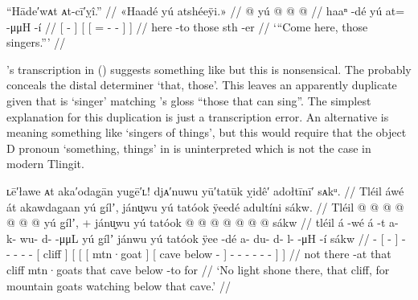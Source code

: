\ex\label{ex:91-78-cmere-singers}%
%
\begingl
	\glpreamble	“Hāde′wᴀt ᴀt-cī′ỵî.” //
	\glpreamble	«\!Haadé yú atshéeÿi.\!» //
	\gla	{}  @ {} {}
		{} yú {}  @ {} @ {} @ {} {} {} //
	\glb	{} haaⁿ -dé {}
		{} yú {} at=  -μμH -í {} {} //
	\glc	{}[  - {}]
		{}[  {}[ =  - - {}] {}] //
	\gld	{} here -to {}
		{} those {} sth\•  {} -er {} {} //
	\glft	‘“Come here, those singers.”’
		//
\endgl
\xe

\citeauthor{swanton:1909}’s transcription  in (\lastx) suggests something like  but this is nonsensical.
The  probably conceals the distal determiner  ‘that, those’.
This leaves an apparently duplicate  given that  is  ‘singer’ matching \citeauthor{swanton:1909}’s gloss “those that can sing”.
The simplest explanation for this duplication is just a transcription error.
An alternative is  meaning something like ‘singers of things’, but this would require that the object D pronoun  ‘something, things’ in  is uninterpreted which is not the case in modern Tlingit.

\ex\label{ex:91-79-no-light-mtn-goats-watching}%
%
\begingl
	\glpreamble	ʟē′ławe ᴀt aka′odag̣ān yug̣ē′ʟ! djᴀ′nuwu yū′tatūk ỵidê′ adołtīnī′ sᴀkᵘ. //
	\glpreamble	Tléil áwé át akawdagaan yú g̱ílʼ, jánu̬wu yú tatóok ÿeedé adultíni sákw. //
	\gla	Tléil  @ {} {}  @ {} {}
		 @ {} @ {} @ {} @ {} @ {}
		{} yú g̱ílʼ, {} +
		{} {} {} jánu̬wu {} {} yú tatóok  @ {} {}
			 @ {} @ {} @ {} @ {} @ {} @ {} {} sákw {} //
	\glb	tléil á -wé {} á -t {}
		a- k- wu- d-  -μμL
		{} yú g̱ílʼ {}
		{} {} {} jánwu {} {} yú tatóok ÿee -dé {}
			a- du- d- l-  -μH -í {} sákw {} //
	\glc	{}  - {}[  - {}]
		- - - -  -
		{}[  cliff {}]
		{}[ {}[ {}[ mtn·goat {}] {}[  cave below - {}]
			- - - -  - - {}]  {}] //
	\gld	not  {} {} there -at {}
		 {} {} {} {} {}
		{} that cliff {}
		{} {} {} mtn·goats {} {} that cave below -to {}
			 {} {} {} {} {} {} {} for {} //
	\glft	‘No light shone there, that cliff, for mountain goats watching below that cave.’
		//
\endgl
\xe

